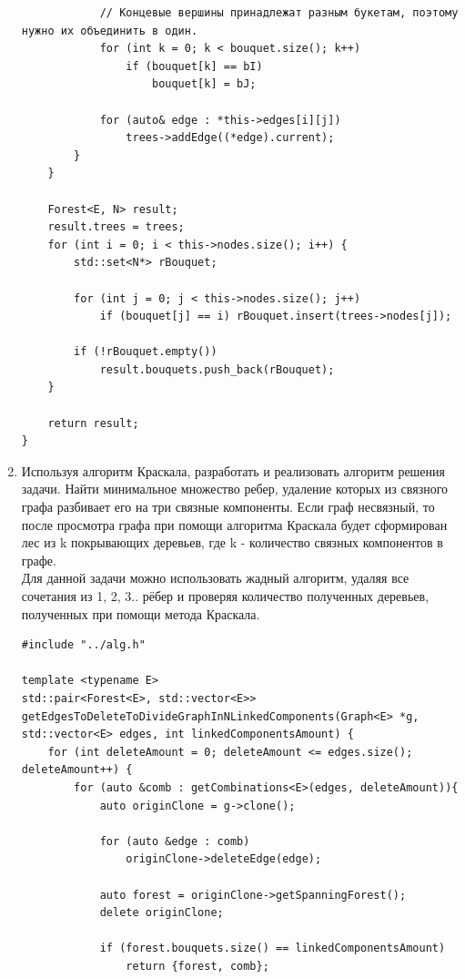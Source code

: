 \documentclass[a4paper,14pt]{extarticle}
\begin{document}
\begin{enumerate}[1.]
\begin{verbatim}
            // Концевые вершины принадлежат разным букетам, поэтому нужно их объединить в один.
            for (int k = 0; k < bouquet.size(); k++)
                if (bouquet[k] == bI)
                    bouquet[k] = bJ;

            for (auto& edge : *this->edges[i][j])
                trees->addEdge((*edge).current);
        }
    }

    Forest<E, N> result;
    result.trees = trees;
    for (int i = 0; i < this->nodes.size(); i++) {
        std::set<N*> rBouquet;
        
        for (int j = 0; j < this->nodes.size(); j++)
            if (bouquet[j] == i) rBouquet.insert(trees->nodes[j]);

        if (!rBouquet.empty()) 
            result.bouquets.push_back(rBouquet);
    }

    return result;
}
        \end{verbatim}
        \item Используя алгоритм Краскала, разработать и реализовать алгоритм решения задачи.\bigbreak
        Найти минимальное множество ребер, удаление которых из связного графа разбивает его на три связные компоненты.\bigbreak
        Если граф несвязный, то после просмотра графа при помощи алгоритма Краскала будет сформирован лес из k покрывающих деревьев,
        где k - количество связных компонентов в графе.\\
        Для данной задачи можно использовать жадный алгоритм, удаляя все сочетания из 1, 2, 3.. рёбер и проверяя количество полученных
        деревьев, полученных при помощи метода Краскала.
        \begin{verbatim}
#include "../alg.h"

template <typename E>
std::pair<Forest<E>, std::vector<E>> getEdgesToDeleteToDivideGraphInNLinkedComponents(Graph<E> *g, std::vector<E> edges, int linkedComponentsAmount) {
    for (int deleteAmount = 0; deleteAmount <= edges.size(); deleteAmount++) {
        for (auto &comb : getCombinations<E>(edges, deleteAmount)){
            auto originClone = g->clone();
            
            for (auto &edge : comb)
                originClone->deleteEdge(edge);
            
            auto forest = originClone->getSpanningForest();
            delete originClone;

            if (forest.bouquets.size() == linkedComponentsAmount) 
                return {forest, comb};


\end{verbatim}
\end{enumerate}
\end{document}
